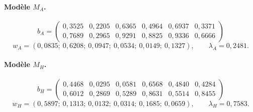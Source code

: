\paragraph{Modèle $M_A$.}
\[b_A=\begin{pmatrix}0,3525 & 0,2205 & 0,6365 & 0,4964 & 0,6937 & 0,3371 \\ 0,7689 & 0,2965 & 0,9291 & 0,8825 & 0,9336 & 0,6666\end{pmatrix}\]
\[w_A=(0,0835;\ 0,6208;\ 0,0947;\ 0,0534;\ 0,0149;\ 0,1327),\qquad \lambda_A=0,2481.\]

\paragraph{Modèle $M_H$.}
\[b_H=\begin{pmatrix}0,4468 & 0,0295 & 0,0581 & 0,6568 & 0,4840 & 0,4284 \\ 0,6012 & 0,2869 & 0,5289 & 0,8631 & 0,5514 & 0,8455\end{pmatrix}\]
\[w_H=(0,5897;\ 0,1313;\ 0,0132;\ 0,0314;\ 0,1685;\ 0,0659),\qquad \lambda_H=0,7583.\]
